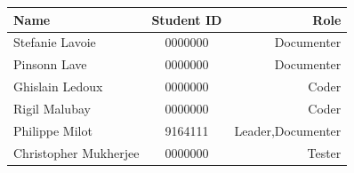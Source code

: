 \documentclass{article}
\begin{document}
\medskip
\begin{center}
\begin{tabular}{| l | c | r |}
\hline
Name & Student ID & Role \\
\hline
\hline
Stefanie Lavoie & 0000000 & Documenter\\
\hline
Pinsonn Lave & 0000000 & Documenter\\
\hline
Ghislain Ledoux & 0000000 & Coder\\
\hline
Rigil Malubay & 0000000 & Coder\\
\hline
Philippe Milot & 9164111 & Leader,Documenter \\
\hline
Christopher Mukherjee & 0000000 & Tester\\
\hline
\end{tabular}
\end{center}
\end{document}
